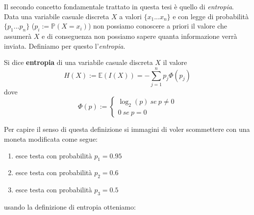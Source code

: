 Il secondo concetto fondamentale trattato in questa tesi è quello di \textit{entropia}.\\
Data una variabile casuale discreta $X$ a valori $\{ x_1...x_n \}$ e con legge di probabilità $\{p_1...p_n \}$ ($p_i:=\mathbb{P}(X=x_i)$) non possiamo conoscere a priori il valore che assumerà $X$ e di conseguenza non possiamo sapere quanta informazione verrà inviata. Definiamo per questo l'\textit{entropia}.
\begin{defi}
Si dice \textbf{entropia} di una variabile casuale discreta $X$ il valore
\begin{equation}
H(X):=\mathbb{E}(I(X))=-\sum_{j=1}^np_j\Phi(p_j)
\end{equation}
dove
$$
\Phi(p):=
\begin{cases}
\log_2(p) \ se \ p \neq 0 \\
0 \ se \  p=0
\end{cases}
$$
\end{defi}
Per capire il senso di questa definizione si immagini di voler scommettere con una moneta modificata come segue:
\begin{enumerate}
\item esce testa con probabilità $p_1=0.95$
\item esce testa con probabilità $p_2=0.6$
\item esce testa con probabilità $p_3=0.5$
\end{enumerate} 
 usando la definizione di entropia otteniamo:
 
